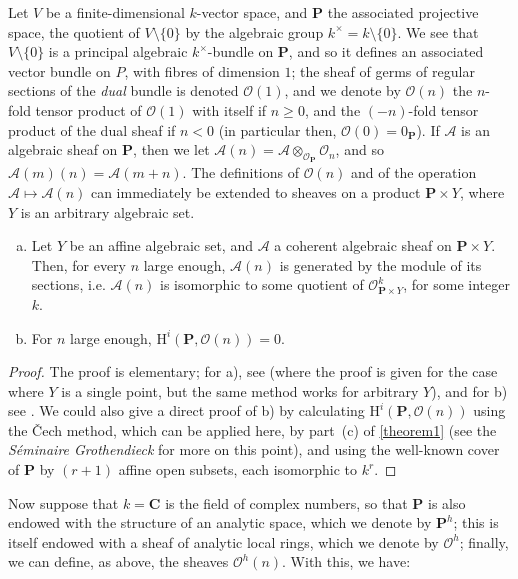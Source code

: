\documentclass{article}
\theoremstyle{plain}
\newenvironment{theorem}[1]
  {\renewcommand\theinnercustomtheorem{#1}\innercustomtheorem}
  {\endinnercustomtheorem}
\theoremstyle{definition}
\newcommand{\sh}{\mathscr}
\newcommand{\HH}{\mathrm{H}}
\renewcommand{\geq}{\geqslant}
\begin{document}
Let $V$ be a finite-dimensional $k$-vector space, and $\mathbf{P}$ the associated projective space, the quotient of $V\setminus\{0\}$ by the algebraic group $k^\times=k\setminus\{0\}$.
We see that $V\setminus\{0\}$ is a principal algebraic $k^\times$-bundle on $\mathbf{P}$, and so it defines an associated vector bundle on $P$, with fibres of dimension $1$;
the sheaf of germs of regular sections of the \emph{dual} bundle is denoted $\sh{O}(1)$, and we denote by $\sh{O}(n)$ the $n$-fold tensor product of $\sh{O}(1)$ with itself if $n\geq0$, and the $(-n)$-fold tensor product of the dual sheaf if $n<0$ (in particular then, $\sh{O}(0)=\sh{0}_\mathbf{P}$).
If $\sh{A}$ is an algebraic sheaf on $\mathbf{P}$, then we let $\sh{A}(n)=\sh{A}\otimes_{\sh{O}_\mathbf{P}}\sh{O}_n$, and so $\sh{A}(m)(n)=\sh{A}(m+n)$.
The definitions of $\sh{O}(n)$ and of the operation $\sh{A}\mapsto\sh{A}(n)$ can immediately be extended to sheaves on a product $\mathbf{P}\times Y$, where $Y$ is an arbitrary algebraic set.

\begin{theorem}{3}
\label{theorem3}
\begin{enumerate}[(a)]
  \item Let $Y$ be an affine algebraic set, and $\sh{A}$ a coherent algebraic sheaf on $\mathbf{P}\times Y$.
    Then, for every $n$ large enough, $\sh{A}(n)$ is generated by the module of its sections, i.e. $\sh{A}(n)$ is isomorphic to some quotient of $\sh{O}_{\mathbf{P}\times Y}^k$, for some integer $k$.
  \item For $n$ large enough, $\HH^i(\mathbf{P},\sh{O}(n))=0$.
\end{enumerate}
\end{theorem}

\begin{proof}
  The proof is elementary; for a), see \cite[page~247, théorème~1]{1} (where the proof is given for the case where $Y$ is a single point, but the same method works for arbitrary $Y$), and for b) see \cite[page~259, théorème~2]{1}.
  We could also give a direct proof of b) by calculating $\HH^i(\mathbf{P},\sh{O}(n))$ using the Čech method, which can be applied here, by part~(c) of \cref{theorem1} (see the \emph{Séminaire Grothendieck} for more on this point), and using the well-known cover of $\mathbf{P}$ by $(r+1)$ affine open subsets, each isomorphic to $k^r$.
\end{proof}

Now suppose that $k=\mathbf{C}$ is the field of complex numbers, so that $\mathbf{P}$ is also endowed with the structure of an analytic space, which we denote by $\mathbf{P}^h$;
this is itself endowed with a sheaf of analytic local rings, which we denote by $\sh{O}^h$;
finally, we can define, as above, the sheaves $\sh{O}^h(n)$.
With this, we have:
\end{document}
